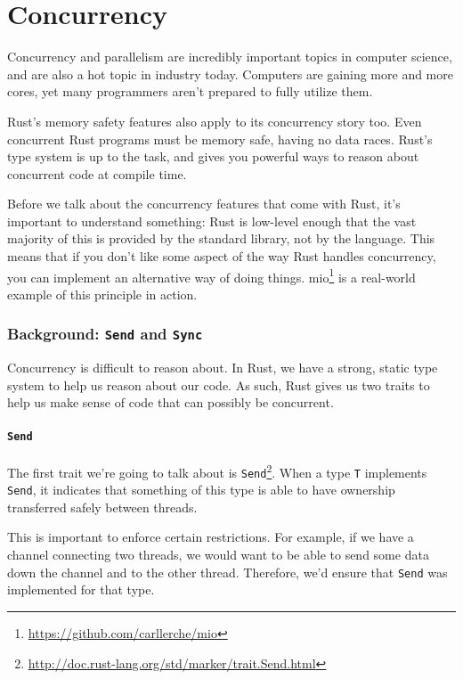 \documentclass[a4paper,]{book}
\renewcommand*{\hypertarget}[3][\ar]{%
  \def\ar{#2}%
  \label{#1}%
  #3}
\renewcommand{\href}[2]{#2\footnote{\url{#1}}}
\let\oldparagraph\paragraph
\renewcommand{\paragraph}[1]{\oldparagraph{#1}\mbox{}}
\begin{document}
\hypertarget{sec--concurrency}{\section{Concurrency}\label{sec--concurrency}}

Concurrency and parallelism are incredibly important topics in computer
science, and are also a hot topic in industry today. Computers are
gaining more and more cores, yet many programmers aren't prepared to
fully utilize them.

Rust's memory safety features also apply to its concurrency story too.
Even concurrent Rust programs must be memory safe, having no data races.
Rust's type system is up to the task, and gives you powerful ways to
reason about concurrent code at compile time.

Before we talk about the concurrency features that come with Rust, it's
important to understand something: Rust is low-level enough that the
vast majority of this is provided by the standard library, not by the
language. This means that if you don't like some aspect of the way Rust
handles concurrency, you can implement an alternative way of doing
things. \href{https://github.com/carllerche/mio}{mio} is a real-world
example of this principle in action.

\subsubsection{\texorpdfstring{Background: \texttt{Send} and
\texttt{Sync}}{Background: Send and Sync}}\label{background-send-and-sync}

Concurrency is difficult to reason about. In Rust, we have a strong,
static type system to help us reason about our code. As such, Rust gives
us two traits to help us make sense of code that can possibly be
concurrent.

\paragraph{\texorpdfstring{\texttt{Send}}{Send}}\label{send}

The first trait we're going to talk about is
\href{http://doc.rust-lang.org/std/marker/trait.Send.html}{\texttt{Send}}.
When a type \texttt{T} implements \texttt{Send}, it indicates that
something of this type is able to have ownership transferred safely
between threads.

This is important to enforce certain restrictions. For example, if we
have a channel connecting two threads, we would want to be able to send
some data down the channel and to the other thread. Therefore, we'd
ensure that \texttt{Send} was implemented for that type.
\end{document}

